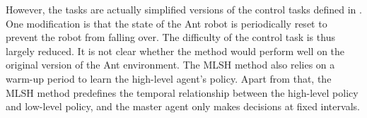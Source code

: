 However, the tasks are actually simplified versions of the control tasks defined in \cite{duan2016benchmarking}. One modification is that the state of the Ant robot is periodically reset to prevent the robot from falling over. The difficulty of the control task is thus largely reduced. It is not clear whether the method would perform well on the original version of the Ant environment.
The MLSH method also relies on a warm-up period to learn the high-level agent's policy. 
Apart from that, the MLSH method predefines the temporal relationship between the high-level policy and low-level policy, and the master agent only makes decisions at fixed intervals.
